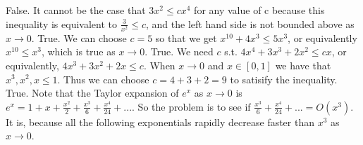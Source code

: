 \documentclass{homework}
\begin{document}
\question
\begin{alphaparts}
    \questionpart False. It cannot be the case that $3x^2 \le cx^4$ for any value of c because this inequality is equivalent to $\frac{3}{x^2} \le c$, and the left hand side is not bounded above as $x \to 0$.
    \questionpart True. We can choose $c=5$ so that we get $x^10 + 4x^3 \le 5x^3$, or equivalently $x^10 \le x^3$, which is true as $x \to 0$.
    \questionpart True. We need $c$ s.t. $4x^4 + 3x^3 + 2x^2 \le cx$, or equivalently, $4x^3 + 3x^2 + 2x \le c$. When $x \to 0$ and $x \in [0,1]$ we have that $x^3, x^2, x \le 1$. Thus we can choose $c = 4 + 3 + 2 = 9$ to satisify the inequality.
    \questionpart True. Note that the Taylor expansion of $e^x$ as $x \to 0$ is $e^x = 1 + x + \frac{x^2}{2} + \frac{x^3}{6} + \frac{x^4}{24} + ...$. So the problem is to see if $\frac{x^3}{6} + \frac{x^4}{24} + ... = O(x^3)$. It is, because all the following exponentials rapidly decrease faster than $x^3$ as $x \to 0$.
\end{alphaparts}
\end{document}
